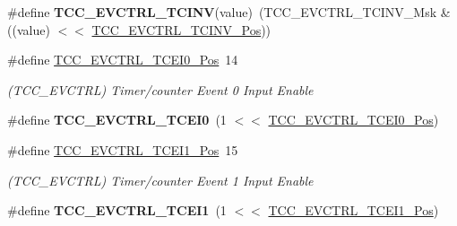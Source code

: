 \begin{DoxyCompactItemize}
\item 
\hypertarget{group___s_a_m_l21___t_c_c_ga7c374f74e15f07161f044d55edbe3066}{}\#define {\bfseries T\+C\+C\+\_\+\+E\+V\+C\+T\+R\+L\+\_\+\+T\+C\+I\+N\+V}(value)~(T\+C\+C\+\_\+\+E\+V\+C\+T\+R\+L\+\_\+\+T\+C\+I\+N\+V\+\_\+\+Msk \& ((value) $<$$<$ \hyperlink{group___s_a_m_l21___t_c_c_ga517b9a375c6274ec2b3545cbfafd3346}{T\+C\+C\+\_\+\+E\+V\+C\+T\+R\+L\+\_\+\+T\+C\+I\+N\+V\+\_\+\+Pos}))\label{group___s_a_m_l21___t_c_c_ga7c374f74e15f07161f044d55edbe3066}

\item 
\hypertarget{group___s_a_m_l21___t_c_c_gacc41fea83dd54e9516713957185d65ae}{}\#define \hyperlink{group___s_a_m_l21___t_c_c_gacc41fea83dd54e9516713957185d65ae}{T\+C\+C\+\_\+\+E\+V\+C\+T\+R\+L\+\_\+\+T\+C\+E\+I0\+\_\+\+Pos}~14\label{group___s_a_m_l21___t_c_c_gacc41fea83dd54e9516713957185d65ae}

\begin{DoxyCompactList}\small\item\em (T\+C\+C\+\_\+\+E\+V\+C\+T\+R\+L) Timer/counter Event 0 Input Enable \end{DoxyCompactList}\item 
\hypertarget{group___s_a_m_l21___t_c_c_ga0a5e02ede598d6c5b3843743380796dc}{}\#define {\bfseries T\+C\+C\+\_\+\+E\+V\+C\+T\+R\+L\+\_\+\+T\+C\+E\+I0}~(1 $<$$<$ \hyperlink{group___s_a_m_l21___t_c_c_gacc41fea83dd54e9516713957185d65ae}{T\+C\+C\+\_\+\+E\+V\+C\+T\+R\+L\+\_\+\+T\+C\+E\+I0\+\_\+\+Pos})\label{group___s_a_m_l21___t_c_c_ga0a5e02ede598d6c5b3843743380796dc}

\item 
\hypertarget{group___s_a_m_l21___t_c_c_gaa22f3652527ed343b276b3b9cf7e41c1}{}\#define \hyperlink{group___s_a_m_l21___t_c_c_gaa22f3652527ed343b276b3b9cf7e41c1}{T\+C\+C\+\_\+\+E\+V\+C\+T\+R\+L\+\_\+\+T\+C\+E\+I1\+\_\+\+Pos}~15\label{group___s_a_m_l21___t_c_c_gaa22f3652527ed343b276b3b9cf7e41c1}

\begin{DoxyCompactList}\small\item\em (T\+C\+C\+\_\+\+E\+V\+C\+T\+R\+L) Timer/counter Event 1 Input Enable \end{DoxyCompactList}\item 
\hypertarget{group___s_a_m_l21___t_c_c_ga26dc6bd4ce373ee00a74e5fb470c12b1}{}\#define {\bfseries T\+C\+C\+\_\+\+E\+V\+C\+T\+R\+L\+\_\+\+T\+C\+E\+I1}~(1 $<$$<$ \hyperlink{group___s_a_m_l21___t_c_c_gaa22f3652527ed343b276b3b9cf7e41c1}{T\+C\+C\+\_\+\+E\+V\+C\+T\+R\+L\+\_\+\+T\+C\+E\+I1\+\_\+\+Pos})\label{group___s_a_m_l21___t_c_c_ga26dc6bd4ce373ee00a74e5fb470c12b1}


\end{DoxyCompactItemize}
